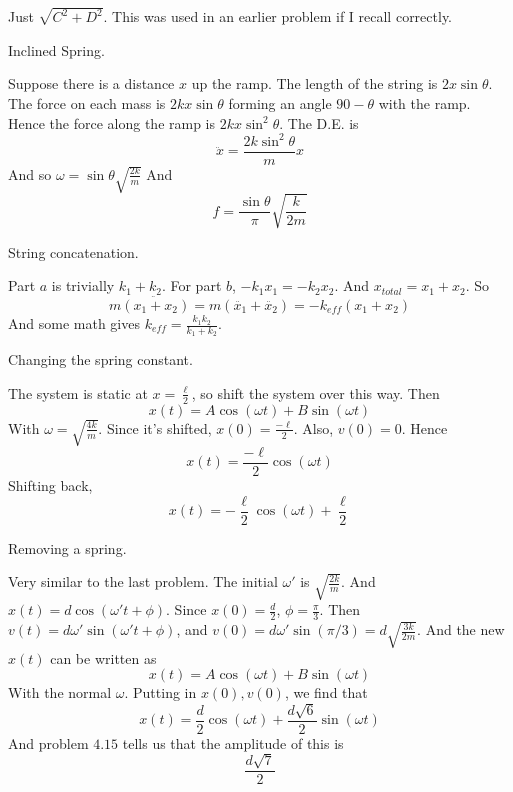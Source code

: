 \documentclass[11pt]{scrartcl}
\begin{document}
\begin{soln}
  Just $\sqrt{C^2+D^2}$. This was used in an earlier problem if I recall correctly.
\end{soln}
\begin{example}
  [4.16]
  Inclined Spring.
\end{example}
\begin{soln}
  Suppose there is a distance $x$ up the ramp. The length of the string is
  $2x\sin\theta$. The force on each mass is $2kx\sin\theta$ forming an angle
  $90-\theta$ with the ramp. Hence the force along the ramp is $2kx\sin^2\theta$.
  The D.E. is
  $$\ddot{x}=\frac{2k\sin^2\theta}{m}x$$
  And so $\omega=\sin\theta \sqrt{\frac{2k}{m}}$
  And $$f=\frac{\sin\theta}{\pi}\sqrt{\frac{k}{2m}}$$
\end{soln}
\begin{example}
  [4.17]
  String concatenation.
\end{example}
\begin{soln}
  Part $a$ is trivially $k_1+k_2$.
  For part $b$, $-k_1x_1=-k_2x_2$. And $x_{total}=x_1+x_2$. So
  $$m\ddot{(x_1+x_2)}=m(\ddot{x_1}+\ddot{x_2})=-k_{eff}(x_1+x_2)$$
  And some math gives $k_{eff}=\frac{k_1k_2}{k_1+k_2}$.
\end{soln}
\begin{example}
  [4.18]
  Changing the spring constant.
\end{example}
\begin{soln}
  The system is static at $x=\frac{\ell}{2}$, so shift the system over this way. Then
  $$x(t)=A\cos(\omega t)+B\sin(\omega t)$$
  With $\omega=\sqrt{\frac{4k}{m}}$. Since it's shifted, $x(0)=\frac{-\ell}{2}$. Also, $v(0)=0$. Hence
  $$x(t)=\frac{-\ell}{2}\cos(\omega t)$$
  Shifting back,
  $$x(t)=-\frac{\ell}{2}\cos(\omega t)+\frac{\ell}{2}$$
\end{soln}
\begin{example}
  [4.19]
  Removing a spring.
\end{example}
\begin{soln}
  Very similar to the last problem. The initial $\omega'$ is $\sqrt{\frac{2k}{m}}$.
  And $x(t)=d\cos(\omega't+\phi)$. Since $x(0)=\frac{d}{2}$, $\phi=\frac{\pi}{3}$.
  Then $v(t)=d\omega'\sin(\omega't+\phi)$, and $v(0)=d\omega'\sin(\pi/3)=d\sqrt{\frac{3k}{2m}}$.
  And the new $x(t)$ can be written as
  $$x(t)=A\cos(\omega t)+B\sin(\omega t)$$
  With the normal $\omega$. Putting in $x(0), v(0)$, we find that
  $$x(t)=\frac{d}{2}\cos(\omega t)+\frac{d\sqrt{6}}{2}\sin(\omega t)$$
  And problem $4.15$ tells us that the amplitude of this is
  $$\frac{d\sqrt{7}}{2}$$
\end{soln}
\end{document}
